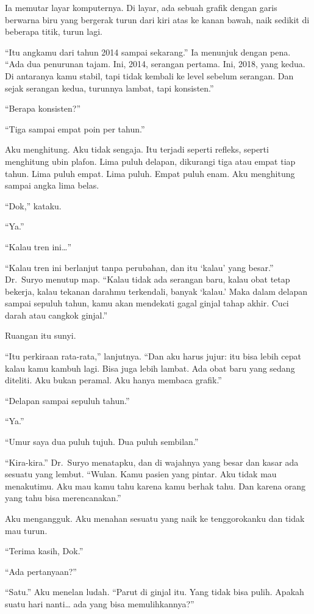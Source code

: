 \documentclass[11pt,twoside,openany]{book}
\begin{document}
Ia memutar layar komputernya. Di layar, ada sebuah grafik dengan garis berwarna biru yang bergerak turun dari kiri atas ke kanan bawah, naik sedikit di beberapa titik, turun lagi.

``Itu angkamu dari tahun 2014 sampai sekarang.'' Ia menunjuk dengan pena. ``Ada dua penurunan tajam. Ini, 2014, serangan pertama. Ini, 2018, yang kedua. Di antaranya kamu stabil, tapi tidak kembali ke level sebelum serangan. Dan sejak serangan kedua, turunnya lambat, tapi konsisten.''

``Berapa konsisten?''

``Tiga sampai empat poin per tahun.''

Aku menghitung. Aku tidak sengaja. Itu terjadi seperti refleks, seperti menghitung ubin plafon. Lima puluh delapan, dikurangi tiga atau empat tiap tahun. Lima puluh empat. Lima puluh. Empat puluh enam. Aku menghitung sampai angka lima belas.

``Dok,'' kataku.

``Ya.''

``Kalau tren ini\ldots{}''

``Kalau tren ini berlanjut tanpa perubahan, dan itu `kalau' yang besar.'' Dr.~Suryo menutup map. ``Kalau tidak ada serangan baru, kalau obat tetap bekerja, kalau tekanan darahmu terkendali, banyak `kalau.' Maka dalam delapan sampai sepuluh tahun, kamu akan mendekati gagal ginjal tahap akhir. Cuci darah atau cangkok ginjal.''

Ruangan itu sunyi.

``Itu perkiraan rata-rata,'' lanjutnya. ``Dan aku harus jujur: itu bisa lebih cepat kalau kamu kambuh lagi. Bisa juga lebih lambat. Ada obat baru yang sedang diteliti. Aku bukan peramal. Aku hanya membaca grafik.''

``Delapan sampai sepuluh tahun.''

``Ya.''

``Umur saya dua puluh tujuh. Dua puluh sembilan.''

``Kira-kira.'' Dr.~Suryo menatapku, dan di wajahnya yang besar dan kasar ada sesuatu yang lembut. ``Wulan. Kamu pasien yang pintar. Aku tidak mau menakutimu. Aku mau kamu tahu karena kamu berhak tahu. Dan karena orang yang tahu bisa merencanakan.''

Aku mengangguk. Aku menahan sesuatu yang naik ke tenggorokanku dan tidak mau turun.

``Terima kasih, Dok.''

``Ada pertanyaan?''

``Satu.'' Aku menelan ludah. ``Parut di ginjal itu. Yang tidak bisa pulih. Apakah suatu hari nanti\ldots{} ada yang bisa memulihkannya?''
\end{document}
